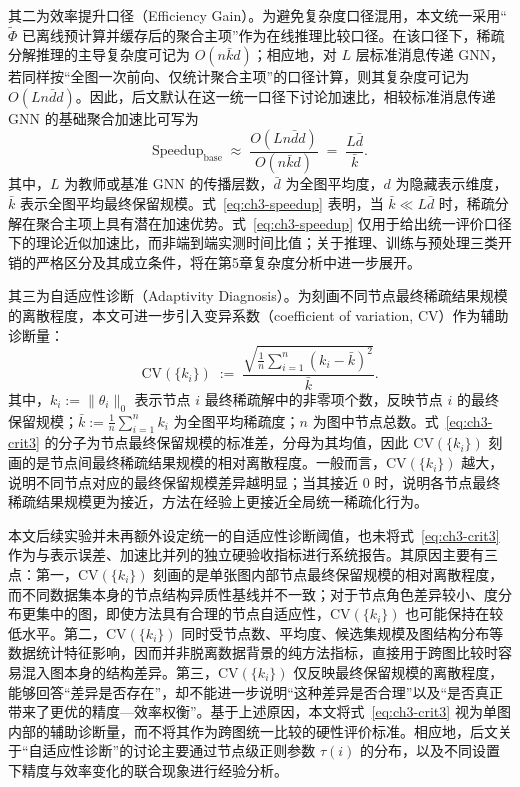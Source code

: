 其二为效率提升口径（Efficiency Gain）。为避免复杂度口径混用，本文统一采用“$\tilde{\Phi}$ 已离线预计算并缓存后的聚合主项”作为在线推理比较口径。在该口径下，稀疏分解推理的主导复杂度可记为 $O(n\bar{k}d)$；相应地，对 $L$ 层标准消息传递 GNN，若同样按“全图一次前向、仅统计聚合主项”的口径计算，则其复杂度可记为 $O(Ln\bar{d}d)$。因此，后文默认在这一统一口径下讨论加速比，相较标准消息传递 GNN 的基础聚合加速比可写为
\begin{equation}
  \mathrm{Speedup}_{\mathrm{base}}
  \;\approx\;
  \frac{O(Ln\bar{d}d)}{O(n\bar{k}d)}
  \;=\;
  \frac{L\bar{d}}{\bar{k}}.
  \label{eq:ch3-speedup}
\end{equation}
其中，$L$ 为教师或基准 GNN 的传播层数，$\bar{d}$ 为全图平均度，$d$ 为隐藏表示维度，$\bar{k}$ 表示全图平均最终保留规模。式~\eqref{eq:ch3-speedup} 表明，当 $\bar{k}\ll L\bar{d}$ 时，稀疏分解在聚合主项上具有潜在加速优势。式~\eqref{eq:ch3-speedup} 仅用于给出统一评价口径下的理论近似加速比，而非端到端实测时间比值；关于推理、训练与预处理三类开销的严格区分及其成立条件，将在第5章复杂度分析中进一步展开。

其三为自适应性诊断（Adaptivity Diagnosis）。为刻画不同节点最终稀疏结果规模的离散程度，本文可进一步引入变异系数（coefficient of variation, CV）作为辅助诊断量：
\begin{equation}
  \mathrm{CV}(\{k_i\})
  \;:=\;
  \frac{
    \sqrt{\frac{1}{n}\sum_{i=1}^n (k_i-\bar{k})^2}
  }{\bar{k}}.
  \label{eq:ch3-crit3}
\end{equation}
其中，$k_i:=\|\theta_i\|_0$ 表示节点 $i$ 最终稀疏解中的非零项个数，反映节点 $i$ 的最终保留规模；$\bar{k}:=\frac{1}{n}\sum_{i=1}^n k_i$ 为全图平均稀疏度；$n$ 为图中节点总数。式~\eqref{eq:ch3-crit3} 的分子为节点最终保留规模的标准差，分母为其均值，因此 $\mathrm{CV}(\{k_i\})$ 刻画的是节点间最终稀疏结果规模的相对离散程度。一般而言，$\mathrm{CV}(\{k_i\})$ 越大，说明不同节点对应的最终保留规模差异越明显；当其接近 $0$ 时，说明各节点最终稀疏结果规模更为接近，方法在经验上更接近全局统一稀疏化行为。

本文后续实验并未再额外设定统一的自适应性诊断阈值，也未将式~\eqref{eq:ch3-crit3} 作为与表示误差、加速比并列的独立硬验收指标进行系统报告。其原因主要有三点：第一，$\mathrm{CV}(\{k_i\})$ 刻画的是单张图内部节点最终保留规模的相对离散程度，而不同数据集本身的节点结构异质性基线并不一致；对于节点角色差异较小、度分布更集中的图，即使方法具有合理的节点自适应性，$\mathrm{CV}(\{k_i\})$ 也可能保持在较低水平。第二，$\mathrm{CV}(\{k_i\})$ 同时受节点数、平均度、候选集规模及图结构分布等数据统计特征影响，因而并非脱离数据背景的纯方法指标，直接用于跨图比较时容易混入图本身的结构差异。第三，$\mathrm{CV}(\{k_i\})$ 仅反映最终保留规模的离散程度，能够回答“差异是否存在”，却不能进一步说明“这种差异是否合理”以及“是否真正带来了更优的精度—效率权衡”。基于上述原因，本文将式~\eqref{eq:ch3-crit3} 视为单图内部的辅助诊断量，而不将其作为跨图统一比较的硬性评价标准。相应地，后文关于“自适应性诊断”的讨论主要通过节点级正则参数 $\tau(i)$ 的分布，以及不同设置下精度与效率变化的联合现象进行经验分析。

